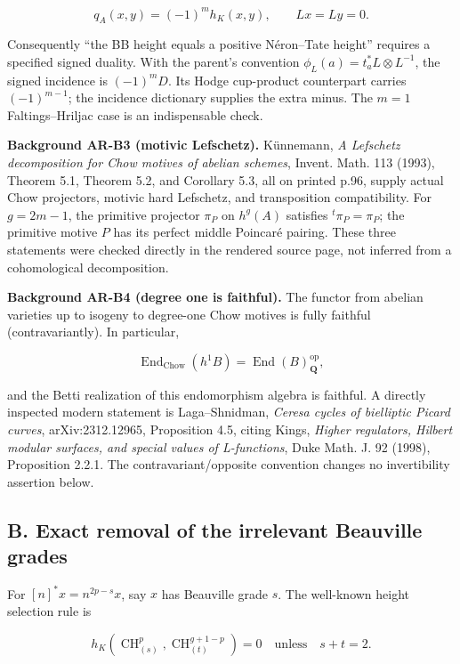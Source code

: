 \documentclass[11pt,a4paper]{article}
\begin{document}
\[
q_A(x,y)=(-1)^m h_K(x,y),\qquad Lx=Ly=0.
\tag{AR.1}
\]

Consequently ``the BB height equals a positive Néron--Tate height''
requires a specified signed duality. With the parent's convention
\(\phi_L(a)=t_a^*L\otimes L^{-1}\), the signed incidence is
\((-1)^m D\). Its Hodge cup-product counterpart carries \((-1)^{m-1}\);
the incidence dictionary supplies the extra minus. The \(m=1\)
Faltings--Hriljac case is an indispensable check.

\textbf{Background AR-B3 (motivic Lefschetz).} Künnemann, \emph{A
Lefschetz decomposition for Chow motives of abelian schemes}, Invent.
Math. 113 (1993), Theorem 5.1, Theorem 5.2, and Corollary 5.3, all on
printed p.96, supply actual Chow projectors, motivic hard Lefschetz, and
transposition compatibility. For \(g=2m-1\), the primitive projector
\(\pi_P\) on \(h^g(A)\) satisfies \({}^t\pi_P=\pi_P\); the primitive
motive \(P\) has its perfect middle Poincaré pairing. These three
statements were checked directly in the rendered source page, not
inferred from a cohomological decomposition.

\textbf{Background AR-B4 (degree one is faithful).} The functor from
abelian varieties up to isogeny to degree-one Chow motives is fully
faithful (contravariantly). In particular,

\[
\operatorname{End}_{\mathrm{Chow}}(h^1B)=\operatorname{End}(B)_{\mathbf Q}^{\mathrm{op}},
\]

and the Betti realization of this endomorphism algebra is faithful. A
directly inspected modern statement is Laga--Shnidman, \emph{Ceresa
cycles of bielliptic Picard curves}, arXiv:2312.12965, Proposition 4.5,
citing Kings, \emph{Higher regulators, Hilbert modular surfaces, and
special values of L-functions}, Duke Math. J. 92 (1998), Proposition
2.2.1. The contravariant/opposite convention changes no invertibility
assertion below.

\subsection{B. Exact removal of the irrelevant Beauville
grades}\label{b.-exact-removal-of-the-irrelevant-beauville-grades}

For \([n]^*x=n^{2p-s}x\), say \(x\) has Beauville grade \(s\). The
well-known height selection rule is

\[
h_K(\operatorname{CH}^p_{(s)},\operatorname{CH}^{g+1-p}_{(t)})=0
\quad\text{unless}\quad s+t=2.
\tag{AR.2}
\]
\end{document}

